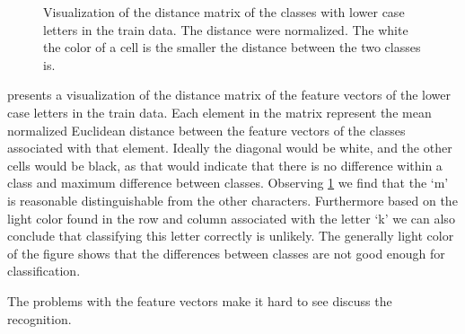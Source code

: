 \begin{figure}[t]
	\centering
	
	\caption{Visualization of the distance matrix of the classes with lower case letters in the train data. The distance were normalized. The white the color of a cell is the smaller the distance between the two classes is.}
	\label{fig:discussion:featureextraction:distanceMatrix}
\end{figure}
 presents a visualization of the distance matrix of the feature vectors of the lower case letters in the train data. Each element in the matrix represent the mean normalized Euclidean distance between the feature vectors of the classes associated with that element. Ideally the diagonal would be white, and the other cells would be black, as that would indicate that there is no difference within a class and maximum difference between classes. Observing \cref{fig:discussion:featureextraction:distanceMatrix} we find that the `m' is reasonable distinguishable from the other characters. Furthermore based on the light color found in the row and column associated with the letter `k' we can also conclude that classifying this letter correctly is unlikely. The generally light color of the figure shows that the differences between classes are not good enough for classification.

The problems with the feature vectors make it hard to see discuss the recognition.